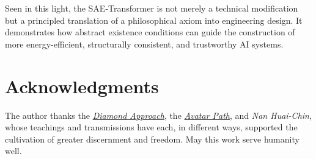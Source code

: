 \documentclass[11pt]{article}
\theoremstyle{plain}
\theoremstyle{definition}
\theoremstyle{remark}
\begin{document}
Seen in this light, the SAE-Transformer is not merely a technical modification but a principled translation of a philosophical axiom into engineering design. It demonstrates how abstract existence conditions can guide the construction of more energy-efficient, structurally consistent, and trustworthy AI systems.


\section*{Acknowledgments}
The author thanks the \href{https://www.diamondapproach.org}{\emph{Diamond Approach}}, 
the \href{https://www.avatarepc.com}{\emph{Avatar Path}}, 
and \emph{Nan Huai-Chin}, whose teachings and transmissions have each, in different ways, 
supported the cultivation of greater discernment and freedom.  
May this work serve humanity well.
\end{document}
